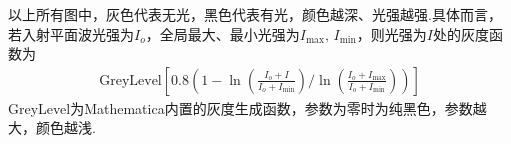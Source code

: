 \begin{note}
	以上所有图中，灰色代表无光，黑色代表有光，颜色越深、光强越强.具体而言，若入射平面波光强为\(I_o\)，全局最大、最小光强为\(I_{\text{max}},\,I_{\text{min}}\)，则光强为\(I\)处的灰度函数为
	\begin{align*}
		\text{GreyLevel}\left[0.8\left(1-\ln\left(\frac{I_o+I}{I_o+I_{\text{min}}}\right)/\ln\left(\frac{I_o+I_{\text{max}}}{I_o+I_{\text{min}}}\right)\right)\right]
	\end{align*}
	GreyLevel为Mathematica内置的灰度生成函数，参数为零时为纯黑色，参数越大，颜色越浅.
\end{note}


